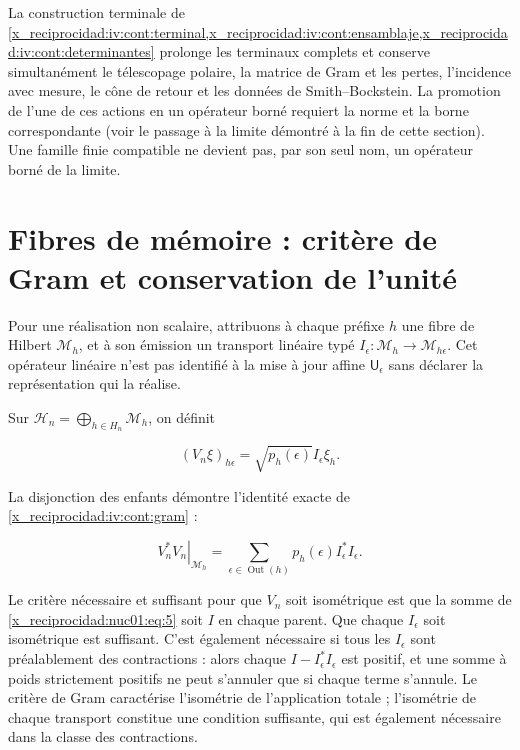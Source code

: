 La construction terminale de \cref{x_reciprocidad:iv:cont:terminal,x_reciprocidad:iv:cont:ensamblaje,x_reciprocidad:iv:cont:determinantes} prolonge les terminaux complets et conserve simultanément le télescopage polaire, la matrice de Gram et les pertes, l’incidence avec mesure, le cône de retour et les données de Smith–Bockstein. La promotion de l’une de ces actions en un opérateur borné requiert la norme et la borne correspondante (voir le passage à la limite démontré à la fin de cette section). Une famille finie compatible ne devient pas, par son seul nom, un opérateur borné de la limite.

\section{Fibres de mémoire : critère de Gram et conservation de l’unité}

Pour une réalisation non scalaire, attribuons à chaque préfixe \(h\) une fibre de Hilbert \(\mathscr M_h\), et à son émission un transport linéaire typé
\(I_\epsilon:\mathscr M_h\to\mathscr M_{h\epsilon}\). Cet opérateur linéaire n’est pas identifié à la mise à jour affine \(\mathsf U_\epsilon\) sans déclarer la représentation qui la réalise.

Sur \(\mathscr H_n=\bigoplus_{h\in H_n}\mathscr M_h\), on définit

\[
(V_n\xi)_{h\epsilon}=\sqrt{p_h(\epsilon)}I_\epsilon\xi_h.
\]

La disjonction des enfants démontre l’identité exacte de \cref{x_reciprocidad:iv:cont:gram} :

\begin{equation}
\left.V_n^*V_n\right|_{\mathscr M_h}
=\sum_{\epsilon\in\operatorname{Out}(h)}p_h(\epsilon)I_\epsilon^*I_\epsilon.
\label{x_reciprocidad:nuc01:eq:5}
\end{equation}

Le critère nécessaire et suffisant pour que \(V_n\) soit isométrique est que la somme de \eqref{x_reciprocidad:nuc01:eq:5} soit \(I\) en chaque parent. Que chaque \(I_\epsilon\) soit isométrique est suffisant. C’est également nécessaire si tous les \(I_\epsilon\) sont préalablement des contractions : alors chaque \(I-I_\epsilon^*I_\epsilon\) est positif, et une somme à poids strictement positifs ne peut s’annuler que si chaque terme s’annule. Le critère de Gram caractérise l’isométrie de l’application totale ; l’isométrie de chaque transport constitue une condition suffisante, qui est également nécessaire dans la classe des contractions.

